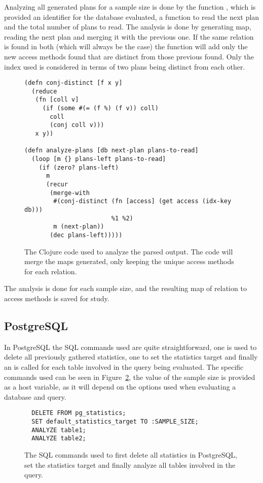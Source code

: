 Analyzing all generated plans for a sample size is done by the function
, which is provided an identifier for the database evaluated,
a function to read the next plan and the total number of plans to read. The
analysis is done by generating map, reading the next plan and merging it with
the previous one. If the same relation is found in both (which will always be
the case) the function  will add only the new access methods
found that are distinct from those previous found. Only the index used is
considered in terms of two plans being distinct from each other.

\begin{figure}[ht]
\begin{verbatim}
(defn conj-distinct [f x y]
  (reduce
   (fn [coll v]
     (if (some #(= (f %) (f v)) coll)
       coll
       (conj coll v)))
   x y))

(defn analyze-plans [db next-plan plans-to-read]
  (loop [m {} plans-left plans-to-read]
    (if (zero? plans-left)
      m
      (recur
       (merge-with
        #(conj-distinct (fn [access] (get access (idx-key db)))
                        %1 %2)
        m (next-plan))
       (dec plans-left)))))
   \end{verbatim}
   \caption[The clojure code to analyze a query]{The Clojure code used to
     analyze the parsed output. The code will merge the maps generated, only
     keeping the unique access methods for each relation.}
\label{fig:clj:analyzing}
\end{figure}

The analysis is done for each sample size, and the resulting map of relation to
access methods is saved for study.

\subsection{PostgreSQL}\label{sec:postgresql}
In PostgreSQL the SQL commands used are quite straightforward, one is used to
delete all previously gathered statistics, one to set the statistics target and
finally an  is called for each table involved in the query being
evaluated. The specific commands used can be seen in
Figure~\ref{fig:sql:pganalyze}, the value of the sample size is provided as a
host variable, as it will depend on the options used when evaluating a database
and query.

\begin{figure}[ht]
\begin{verbatim}
  DELETE FROM pg_statistics;
  SET default_statistics_target TO :SAMPLE_SIZE;
  ANALYZE table1;
  ANALYZE table2;
\end{verbatim}
\caption[The SQL commands used to resample inPostgreSQL.]{The SQL commands used
  to first delete all statistics in PostgreSQL, set the statistics target and
  finally analyze all tables involved in the query.}
\label{fig:sql:pganalyze}
\end{figure}

